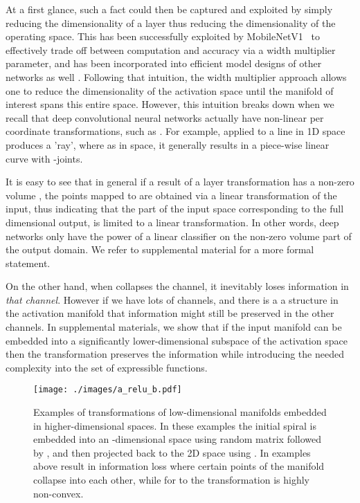 \documentclass[10pt,twocolumn,letterpaper]{article}
\begin{document}
At a first glance, such a fact could then be captured and exploited by simply reducing the dimensionality of a layer thus reducing the dimensionality of the operating space.
This has been successfully exploited by \mbox{MobileNetV1}~\cite{MobilenetV1} to effectively trade off between computation and accuracy via a width multiplier parameter, and has been incorporated into efficient model designs of other networks as well \cite{ShuffleNet2017}.
Following that intuition, the width multiplier approach allows one to reduce the dimensionality of the activation space until the manifold of interest spans
this entire space.
However, this intuition breaks down when we recall that deep convolutional neural networks actually have non-linear per coordinate transformations, such as .
For example,  applied to a line in 1D space produces a 'ray', where as in  space, it generally results in a piece-wise linear curve with -joints.

It is easy to see that in general if a result of a layer transformation  has a non-zero volume , the points mapped to  are obtained via a linear transformation  of the input, thus indicating that the part of the input space corresponding to the full dimensional output, is limited to a linear transformation.
In other words, deep networks only have the power of a linear classifier on the non-zero volume part of the output domain.
We refer to supplemental material for a more formal statement. 

On the other hand, when  collapses the channel, it inevitably loses information in {\it that channel}. However if we have lots of channels, and there is a a structure in the activation manifold that information might still be preserved in the other channels. 
In supplemental materials, we show that if the input manifold can be embedded into a significantly lower-dimensional subspace of the activation space then the  transformation preserves the information while introducing the needed complexity into the set of expressible functions.

\begin{figure}
    \texttt{[image: ./images/a\_relu\_b.pdf]}
    \caption{\small{
        Examples of  transformations of low-dimensional manifolds embedded in
        higher-dimensional spaces.
        In these examples the initial spiral is embedded into an -dimensional space using random matrix  followed by , and then projected back to the 2D space using . In examples above  result in
        information loss where certain points of the manifold collapse into each other,
        while for  to  the  transformation is highly non-convex.}
    }
    \label{fig:a_relu_b_spiral}
\end{figure}
\end{document}

